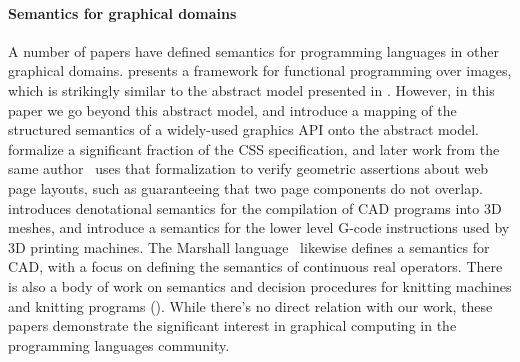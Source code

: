 \documentclass[main.tex]{subfiles}
\begin{document}
\paragraph{Semantics for graphical domains}

A number of papers have defined semantics for
  programming languages in other graphical domains.
\citet{conal} presents a framework for functional programming over images,
  which is strikingly similar to the abstract model presented in .
However, in this paper we go beyond this abstract model,
  and introduce a mapping of the structured semantics of a widely-used graphics API
  onto the abstract model.
\citet{cassius} formalize a significant fraction of the CSS specification,
  and later work from the same author~\cite{vizassert}
  uses that formalization to verify geometric assertions
  about web page layouts,
  such as guaranteeing that two page components do not overlap.
\citet{reincarnate} introduces denotational semantics
  for the compilation of CAD programs into 3D meshes,
  and \citet{gcode} introduce a semantics for the lower level
  G-code instructions used by 3D printing machines.
The Marshall language~\cite{marshall}
  likewise defines a semantics for CAD,
  with a focus on defining the semantics of continuous real operators.
There is also a body of work on semantics and decision procedures
  for knitting machines and knitting programs (\citet*{knitsem, knitequiv, ufo}).
While there's no direct relation with our work,
  these papers demonstrate the significant interest in graphical computing
  in the programming languages community.
\end{document}
